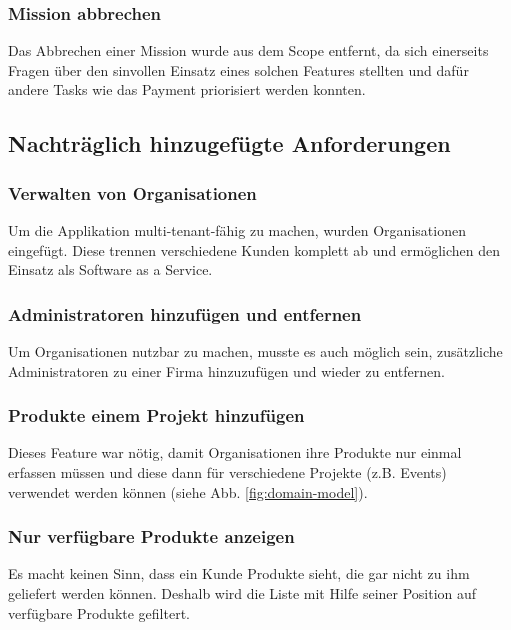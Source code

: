 \subsubsection{Mission abbrechen}

Das Abbrechen einer Mission wurde aus dem Scope entfernt, da sich einerseits Fragen über den sinvollen Einsatz eines solchen Features stellten und dafür andere Tasks wie das Payment priorisiert werden konnten.

\subsection{Nachträglich hinzugefügte Anforderungen}

\subsubsection{Verwalten von Organisationen}

Um die Applikation multi-tenant-fähig zu machen, wurden Organisationen eingefügt. Diese trennen verschiedene Kunden komplett ab und ermöglichen den Einsatz als Software as a Service.

\subsubsection{Administratoren hinzufügen und entfernen}

Um Organisationen nutzbar zu machen, musste es auch möglich sein, zusätzliche Administratoren zu einer Firma hinzuzufügen und wieder zu entfernen.

\subsubsection{Produkte einem Projekt hinzufügen}

Dieses Feature war nötig, damit Organisationen ihre Produkte nur einmal erfassen müssen und diese dann für verschiedene Projekte (z.B. Events) verwendet werden können (siehe Abb. \ref{fig:domain-model}).

\subsubsection{Nur verfügbare Produkte anzeigen}

Es macht keinen Sinn, dass ein Kunde Produkte sieht, die gar nicht zu ihm geliefert werden können. Deshalb wird die Liste mit Hilfe seiner Position auf verfügbare Produkte gefiltert.

